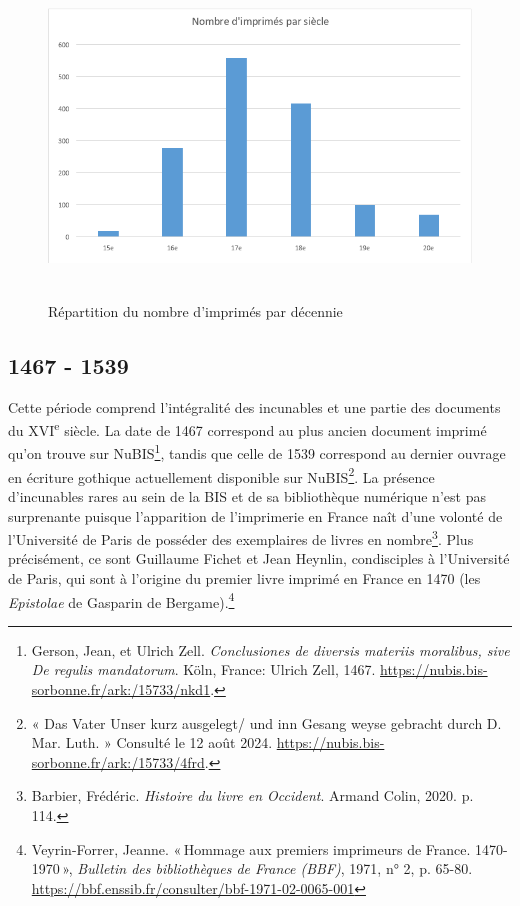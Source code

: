 \documentclass[a4paper,12pt,twoside]{book}
\begin{document}
\begin{figure} [H]
	
\includegraphics[width=5.82403in,height=3.36667in]{vertopal_157ae480aa4a4b07be198b586a812241/media/image5.png}

\caption{Répartition du nombre d'imprimés par décennie}

\end{figure}

\subsection{1467 - 1539}

Cette période comprend l'intégralité des incunables et une partie des
documents du XVI\textsuperscript{e} siècle. La date de 1467 correspond
au plus ancien document imprimé qu'on trouve sur NuBIS\footnote{Gerson,
	Jean, et Ulrich Zell. \emph{Conclusiones de diversis materiis
		moralibus, sive De regulis mandatorum}. Köln, France: Ulrich Zell,
	1467.
	\url{https://nubis.bis-sorbonne.fr/ark:/15733/nkd1}.},
tandis que celle de 1539 correspond au dernier ouvrage en écriture
gothique actuellement disponible sur NuBIS\footnote{« Das Vater Unser
	kurz ausgelegt/ und inn Gesang weyse gebracht durch D. Mar. Luth. »
	Consulté le 12 août 2024.
	\url{https://nubis.bis-sorbonne.fr/ark:/15733/4frd}.}.
La présence d'incunables rares au sein de la BIS et de sa bibliothèque
numérique n'est pas surprenante puisque l'apparition de l'imprimerie en
France naît d'une volonté de l'Université de Paris de posséder des
exemplaires de livres en nombre\footnote{Barbier, Frédéric.
	\emph{Histoire du livre en Occident}. Armand Colin, 2020. p. 114.}.
Plus précisément, ce sont Guillaume Fichet et Jean Heynlin, condisciples
à l'Université de Paris, qui sont à l'origine du premier
livre imprimé en France en 1470 (les \emph{Epistolae} de Gasparin de
Bergame).\footnote{Veyrin-Forrer, Jeanne. «\,Hommage aux premiers
	imprimeurs de France. 1470-1970\,», \emph{Bulletin des bibliothèques
		de France (BBF)}, 1971, n° 2, p. 65-80.
	\url{https://bbf.enssib.fr/consulter/bbf-1971-02-0065-001}} \\
\end{document}
